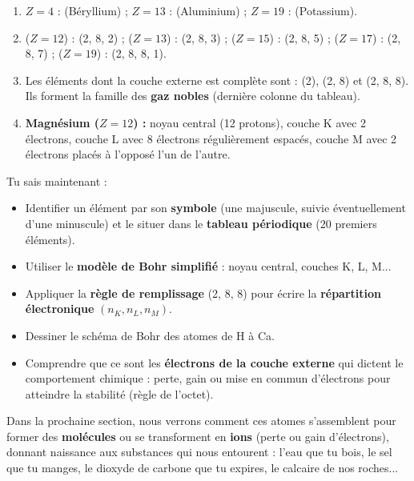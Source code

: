 \documentclass[11pt]{article}
\newcounter{popsec}
\newcounter{popsub}
\newcommand{\courssub}[1]{%
  \stepcounter{popsub}%
  \par\vspace{9pt}\noindent{\popxbold\fontsize{11.5}{13}\selectfont\color{popink}{\color{poporange}\thepopsec.\thepopsub}\hspace{6pt}#1}\par\nopagebreak\vspace{4pt}
}
\begin{document}
\begin{corrige}
\begin{enumerate}
    \item $Z = 4$ :  (Béryllium) ; $Z = 13$ :  (Aluminium) ; $Z = 19$ :  (Potassium).
    \item {} ($Z = 12$) : (2, 8, 2) ;  ($Z = 13$) : (2, 8, 3) ;  ($Z = 15$) : (2, 8, 5) ;  ($Z = 17$) : (2, 8, 7) ;  ($Z = 19$) : (2, 8, 8, 1).
    \item Les éléments dont la couche externe est complète sont :  (2),  (2, 8) et  (2, 8, 8). Ils forment la famille des \textbf{gaz nobles} (dernière colonne du tableau).
    \item \textbf{Magnésium  ($Z = 12$) :} noyau central (12 protons), couche K avec 2 électrons, couche L avec 8 électrons régulièrement espacés, couche M avec 2 électrons placés à l'opposé l'un de l'autre.
\end{enumerate}
\end{corrige}

\courssub{Bilan de la section}

Tu sais maintenant :
\begin{itemize}
    \item Identifier un élément par son \textbf{symbole} (une majuscule, suivie éventuellement d'une minuscule) et le situer dans le \textbf{tableau périodique} (20 premiers éléments).
    \item Utiliser le \textbf{modèle de Bohr simplifié} : noyau central, couches K, L, M...
    \item Appliquer la \textbf{règle de remplissage} (2, 8, 8) pour écrire la \textbf{répartition électronique} $(n_K, n_L, n_M)$.
    \item Dessiner le schéma de Bohr des atomes de H à Ca.
    \item Comprendre que ce sont les \textbf{électrons de la couche externe} qui dictent le comportement chimique : perte, gain ou mise en commun d'électrons pour atteindre la stabilité (règle de l'octet).
\end{itemize}

Dans la prochaine section, nous verrons comment ces atomes s'assemblent pour former des \textbf{molécules} ou se transforment en \textbf{ions} (perte ou gain d'électrons), donnant naissance aux substances qui nous entourent : l'eau que tu bois, le sel que tu manges, le dioxyde de carbone que tu expires, le calcaire de nos roches...
\end{document}
